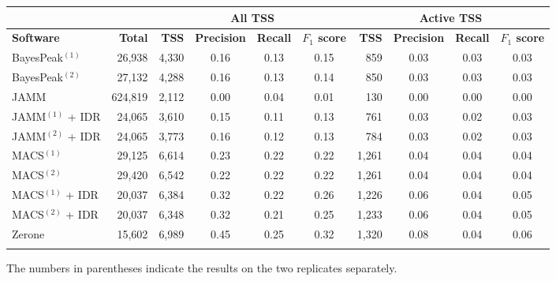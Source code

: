 \documentclass{bioinfo}
\begin{document}
\begin{table}[!t]
{\begin{tabular}{lr|rccc|rccc}
        \multicolumn{2}{c}{} & \multicolumn{4}{c}{\textbf{All TSS}} & \multicolumn{4}{c}{\textbf{Active TSS}} \\
        \midrule
        \textbf{Software} & \textbf{Total} &
        \textbf{TSS} & \textbf{Precision} & \textbf{Recall} & \textbf{$F_{1}$ score} &
        \textbf{TSS} & \textbf{Precision} & \textbf{Recall} & \textbf{$F_{1}$ score} \\
        \midrule
        BayesPeak$^{(1)}$  &  26,938 & 4,330 & 0.16 & 0.13 & 0.15 &   859 & 0.03 & 0.03 & 0.03 \\
        BayesPeak$^{(2)}$  &  27,132 & 4,288 & 0.16 & 0.13 & 0.14 &   850 & 0.03 & 0.03 & 0.03 \\
        JAMM               & 624,819 & 2,112 & 0.00 & 0.04 & 0.01 &   130 & 0.00 & 0.00 & 0.00 \\
        JAMM$^{(1)}$ + IDR &  24,065 & 3,610 & 0.15 & 0.11 & 0.13 &   761 & 0.03 & 0.02 & 0.03 \\
        JAMM$^{(2)}$ + IDR &  24,065 & 3,773 & 0.16 & 0.12 & 0.13 &   784 & 0.03 & 0.02 & 0.03 \\
        MACS$^{(1)}$       &  29,125 & 6,614 & 0.23 & 0.22 & 0.22 & 1,261 & 0.04 & 0.04 & 0.04 \\
        MACS$^{(2)}$       &  29,420 & 6,542 & 0.22 & 0.22 & 0.22 & 1,261 & 0.04 & 0.04 & 0.04 \\
        MACS$^{(1)}$ + IDR &  20,037 & 6,384 & 0.32 & 0.22 & 0.26 & 1,226 & 0.06 & 0.04 & 0.05 \\
        MACS$^{(2)}$ + IDR &  20,037 & 6,348 & 0.32 & 0.21 & 0.25 & 1,233 & 0.06 & 0.04 & 0.05 \\
        Zerone             &  15,602 & 6,989 & 0.45 & 0.25 & 0.32 & 1,320 & 0.08 & 0.04 & 0.06 \\
        \botrule
\end{tabular}}{The numbers in parentheses indicate the results on the two
replicates separately.}
\end{table}
\end{document}
